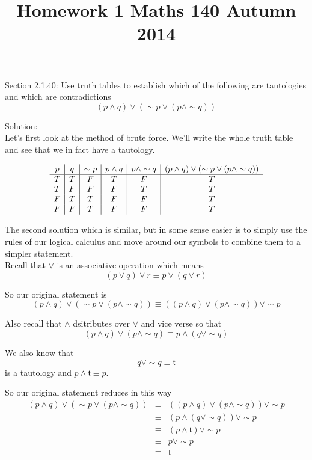 \documentclass[10 pt]{amsart}
\theoremstyle{definition}
\theoremstyle{remark}
\numberwithin{equation}{subsection}
\begin{document}
\title{Homework 1 Maths 140 Autumn 2014}
\maketitle

Section 2.1.40: Use truth tables to establish which of the following are tautologies and which are contradictions\\
\[
(p\wedge q) \vee (\sim p \vee (p \wedge \sim q))
\]

Solution:\\
Let's first look at the method of brute force.  We'll write the whole truth table and see that we in fact have a tautology.

\[\begin{array}{c | c | c | c | c | c}
p & q & \sim p &  p\wedge q & p \wedge \sim q & (p\wedge q) \vee (\sim p \vee (p \wedge \sim q))\\
\hline
T & T & F & T & F & T \\
T & F & F & F & T & T \\
F & T & T & F & F & T \\
F & F & T & F & F & T 
\end{array}
\]

The second solution which is similar, but in some sense easier is to simply use the rules of our logical calculus and move around our symbols to combine them to a simpler statement.\\

Recall that $\vee$ is an associative operation which means
\[
(p\vee q)\vee r \equiv p \vee (q\vee r)
\]

So our original statement is
\[
(p\wedge q) \vee (\sim p \vee (p \wedge \sim q)) \equiv ((p\wedge q) \vee (p\wedge \sim q)) \vee \sim p
\]

Also recall that $\wedge$ dsitributes over $\vee$ and vice verse so that
\[
(p\wedge q) \vee (p\wedge \sim q) \equiv p \wedge (q \vee \sim q)
\]

We also know that 
\[
q\vee \sim q \equiv \mathfrak{t}
\] is a tautology and $p\wedge \mathfrak{t} \equiv p$.

So our original statement reduces in this way
\begin{eqnarray*}
(p\wedge q) \vee (\sim p \vee (p \wedge \sim q)) & \equiv & ((p\wedge q) \vee (p\wedge \sim q)) \vee \sim p \\
& \equiv & (p\wedge (q\vee\sim q))\vee \sim p\\
& \equiv & (p\wedge \mathfrak{t}) \vee \sim p\\
& \equiv & p \vee \sim p\\
& \equiv & \mathfrak{t} 
\end{eqnarray*}
\end{document}

